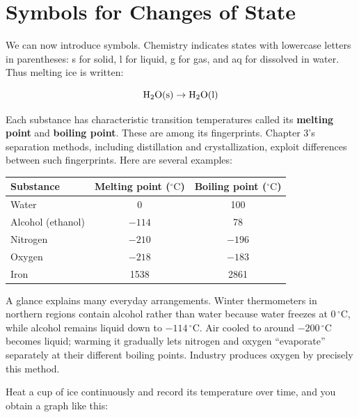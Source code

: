 \section{Symbols for Changes of State}

We can now introduce symbols. Chemistry indicates states with lowercase letters in parentheses: s for solid, l for liquid, g for gas, and aq for dissolved in water. Thus melting ice is written:

\[\mathrm{H_2O(s)} \rightarrow \mathrm{H_2O(l)}\]

Each substance has characteristic transition temperatures called its \textbf{melting point} and \textbf{boiling point}. These are among its fingerprints. Chapter 3's separation methods, including distillation and crystallization, exploit differences between such fingerprints. Here are several examples:

\begin{table}[htbp]
\centering
\begin{tabular}{lcc}
\toprule
Substance & Melting point ($^{\circ}\mathrm{C}$) & Boiling point ($^{\circ}\mathrm{C}$) \\
\midrule
Water & 0 & 100 \\
Alcohol (ethanol) & $-114$ & 78 \\
Nitrogen & $-210$ & $-196$ \\
Oxygen & $-218$ & $-183$ \\
Iron & 1538 & 2861 \\
\bottomrule
\end{tabular}
\end{table}

A glance explains many everyday arrangements. Winter thermometers in northern regions contain alcohol rather than water because water freezes at $0\,^{\circ}\mathrm{C}$, while alcohol remains liquid down to $-114\,^{\circ}\mathrm{C}$. Air cooled to around $-200\,^{\circ}\mathrm{C}$ becomes liquid; warming it gradually lets nitrogen and oxygen ``evaporate'' separately at their different boiling points. Industry produces oxygen by precisely this method.

Heat a cup of ice continuously and record its temperature over time, and you obtain a graph like this:

\begin{center}
\end{center}

